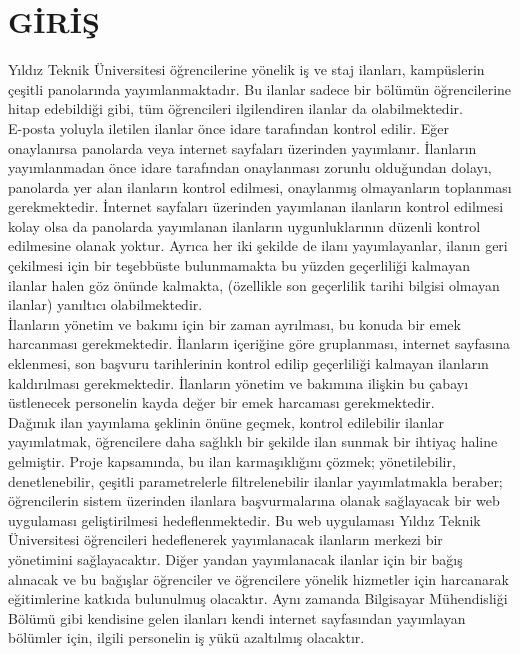 \chapter{GİRİŞ}
Yıldız Teknik Üniversitesi öğrencilerine yönelik iş ve staj ilanları, kampüslerin çeşitli
panolarında yayımlanmaktadır. Bu ilanlar sadece bir bölümün öğrencilerine hitap
edebildiği gibi, tüm öğrencileri ilgilendiren ilanlar da olabilmektedir. \\
E-posta yoluyla iletilen ilanlar önce idare tarafından kontrol edilir. Eğer onaylanırsa
panolarda veya internet sayfaları üzerinden yayımlanır. İlanların yayımlanmadan önce
idare tarafından onaylanması zorunlu olduğundan dolayı, panolarda yer alan ilanların
kontrol edilmesi, onaylanmış olmayanların toplanması gerekmektedir. İnternet sayfaları
üzerinden yayımlanan ilanların kontrol edilmesi kolay olsa da panolarda yayımlanan
ilanların uygunluklarının düzenli kontrol edilmesine olanak yoktur. Ayrıca her iki
şekilde de ilanı yayımlayanlar, ilanın geri çekilmesi için bir teşebbüste bulunmamakta
bu yüzden geçerliliği kalmayan ilanlar halen göz önünde kalmakta, (özellikle son
geçerlilik tarihi bilgisi olmayan ilanlar) yanıltıcı olabilmektedir. \\
İlanların yönetim ve bakımı için bir zaman ayrılması, bu konuda bir emek harcanması
gerekmektedir. İlanların içeriğine göre gruplanması, internet sayfasına eklenmesi, son
başvuru tarihlerinin kontrol edilip geçerliliği kalmayan ilanların kaldırılması
gerekmektedir. İlanların yönetim ve bakımına ilişkin bu çabayı üstlenecek 
personelin kayda değer bir emek harcaması gerekmektedir. \\
Dağınık ilan yayınlama şeklinin önüne geçmek, kontrol edilebilir ilanlar yayımlatmak,
öğrencilere daha sağlıklı bir şekilde ilan sunmak bir ihtiyaç haline gelmiştir. Proje
kapsamında, bu ilan karmaşıklığını çözmek; yönetilebilir, denetlenebilir, çeşitli
parametrelerle filtrelenebilir ilanlar yayımlatmakla beraber; öğrencilerin sistem
üzerinden ilanlara başvurmalarına olanak sağlayacak bir web uygulaması geliştirilmesi
hedeflenmektedir. Bu web uygulaması Yıldız Teknik Üniversitesi öğrencileri
hedeflenerek yayımlanacak ilanların merkezi bir yönetimini sağlayacaktır. Diğer yandan
yayımlanacak ilanlar için bir bağış alınacak ve bu bağışlar öğrenciler ve öğrencilere yönelik hizmetler için harcanarak
eğitimlerine katkıda bulunulmuş olacaktır. Aynı zamanda Bilgisayar Mühendisliği
Bölümü gibi kendisine gelen ilanları kendi internet sayfasından yayımlayan bölümler
için, ilgili personelin iş yükü azaltılmış olacaktır.
